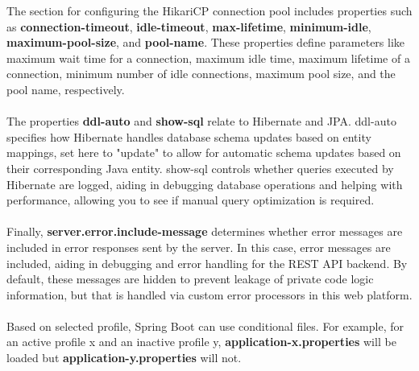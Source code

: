 \noindent The section for configuring the HikariCP \cite{hikaricp} connection pool includes properties such as \textbf{connection-timeout}, \textbf{idle-timeout}, \textbf{max-lifetime}, \textbf{minimum-idle}, \textbf{maximum-pool-size}, and \textbf{pool-name}. These properties define parameters like maximum wait time for a connection, maximum idle time, maximum lifetime of a connection, minimum number of idle connections, maximum pool size, and the pool name, respectively.
\\\\
\noindent The properties \textbf{ddl-auto} and \textbf{show-sql} relate to Hibernate and JPA. ddl-auto specifies how Hibernate handles database schema updates based on entity mappings, set here to "update" to allow for automatic schema updates based on their corresponding Java entity. show-sql controls whether queries executed by Hibernate are logged, aiding in debugging database operations and helping with performance, allowing you to see if manual query optimization is required.
\\\\
\noindent Finally, \textbf{server.error.include-message} determines whether error messages are included in error responses sent by the server. In this case, error messages are included, aiding in debugging and error handling for the REST API backend. By default, these messages are hidden to prevent leakage of private code logic information, but that is handled via custom error processors in this web platform.
\\\\
\noindent Based on selected profile, Spring Boot can use conditional files. For example, for an active profile x and an inactive profile y, \mbox{\textbf{application-x.properties}} will be loaded but \mbox{\textbf{application-y.properties}} will not.
\\\\
